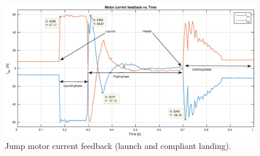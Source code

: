 \begin{figure}
\centering
\includegraphics[width=1\textwidth]{images/experiments/jump/jump-current-feedback.eps} 
\caption{Jump motor current feedback (launch and compliant landing).}
\label{fig:jump-motor-current-feedback}
\end{figure}

